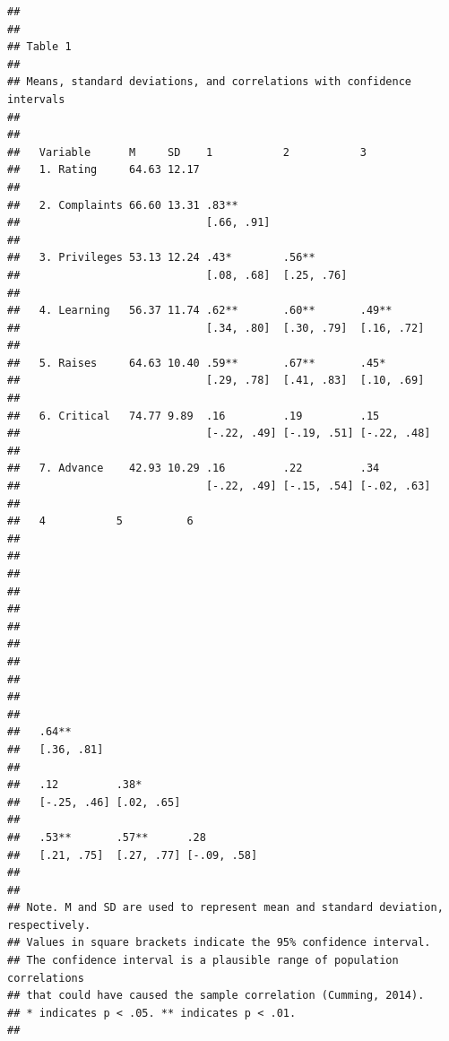 \documentclass[]{book}
\theoremstyle{definition}
\theoremstyle{definition}
\theoremstyle{definition}
\theoremstyle{remark}
\begin{document}
\begin{verbatim}
## 
## 
## Table 1 
## 
## Means, standard deviations, and correlations with confidence intervals
##  
## 
##   Variable      M     SD    1           2           3          
##   1. Rating     64.63 12.17                                    
##                                                                
##   2. Complaints 66.60 13.31 .83**                              
##                             [.66, .91]                         
##                                                                
##   3. Privileges 53.13 12.24 .43*        .56**                  
##                             [.08, .68]  [.25, .76]             
##                                                                
##   4. Learning   56.37 11.74 .62**       .60**       .49**      
##                             [.34, .80]  [.30, .79]  [.16, .72] 
##                                                                
##   5. Raises     64.63 10.40 .59**       .67**       .45*       
##                             [.29, .78]  [.41, .83]  [.10, .69] 
##                                                                
##   6. Critical   74.77 9.89  .16         .19         .15        
##                             [-.22, .49] [-.19, .51] [-.22, .48]
##                                                                
##   7. Advance    42.93 10.29 .16         .22         .34        
##                             [-.22, .49] [-.15, .54] [-.02, .63]
##                                                                
##   4           5          6          
##                                     
##                                     
##                                     
##                                     
##                                     
##                                     
##                                     
##                                     
##                                     
##                                     
##                                     
##   .64**                             
##   [.36, .81]                        
##                                     
##   .12         .38*                  
##   [-.25, .46] [.02, .65]            
##                                     
##   .53**       .57**      .28        
##   [.21, .75]  [.27, .77] [-.09, .58]
##                                     
## 
## Note. M and SD are used to represent mean and standard deviation, respectively.
## Values in square brackets indicate the 95% confidence interval.
## The confidence interval is a plausible range of population correlations 
## that could have caused the sample correlation (Cumming, 2014).
## * indicates p < .05. ** indicates p < .01.
## 
\end{verbatim}
\end{document}
